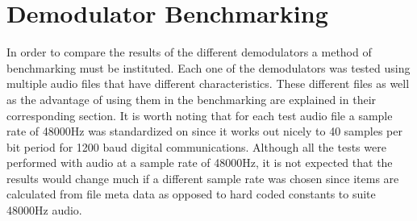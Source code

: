 \chapter{Demodulator Benchmarking}
In order to compare the results of the different demodulators a method of benchmarking must be instituted. Each one of the demodulators was tested using multiple audio files that have different characteristics. These different files as well as the advantage of using them in the benchmarking are explained in their corresponding section. It is worth noting that for each test audio file a sample rate of 48000Hz was standardized on since it works out nicely to 40 samples per bit period for 1200 baud digital communications. Although all the tests were performed with audio at a sample rate of 48000Hz, it is not expected that the results would change much if a different sample rate was chosen since items are calculated from file meta data as opposed to hard coded constants to suite 48000Hz audio.


